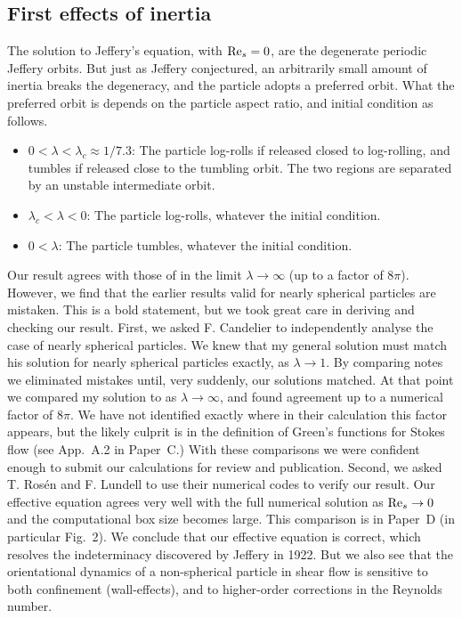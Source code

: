 \documentclass[thesis.tex]{subfiles}
\begin{document}
\subsection*{First effects of inertia}

The solution to Jeffery's equation,  with $\textrm{Re}_s=0$, are the degenerate periodic Jeffery orbits. But just as Jeffery conjectured, an arbitrarily small amount of inertia breaks the degeneracy, and the particle adopts a preferred orbit. What the preferred orbit is depends on the particle aspect ratio, and initial condition as follows.
\begin{itemize}
    \item $0 < \lambda < \lambda_c \approx 1/7.3$: The particle log-rolls if released closed to log-rolling, and tumbles if released close to the tumbling orbit. The two regions are separated by an unstable intermediate orbit.
    \item $\lambda_c < \lambda < 0$: The particle log-rolls, whatever the initial condition.
    \item $0 < \lambda$: The particle tumbles, whatever the initial condition.
\end{itemize}

Our result  agrees with those of \citet{subramanian2005} in the limit $\lambda\to\infty$ (up to a factor of $8\pi$). However, we find that the earlier results valid for nearly spherical particles \cite{saffman1956,subramanian2006} are mistaken. This is a bold statement, but we took great care in deriving and checking our result. First, we asked F. Candelier to independently analyse the case of nearly spherical particles. We knew that my general solution must match his solution for nearly spherical particles exactly, as $\lambda\to1$. By comparing notes we eliminated mistakes until, very suddenly, our solutions matched. At that point we compared my solution to \citet{subramanian2005} as $\lambda\to\infty$, and found agreement up to a numerical factor of $8\pi$. We have not identified exactly where in their calculation this factor appears, but the likely culprit is in the definition of Green's functions for Stokes flow (see App.~A.2 in Paper~C.) With these comparisons we were confident enough to submit our calculations for review and publication. Second, we asked T. Ros\'en and F. Lundell to use their numerical codes to verify our result. Our effective equation  agrees very well with the full numerical solution as $\textrm{Re}_s\to0$ and the computational box size becomes large. This comparison is in Paper~D (in particular Fig.~2). We conclude that our effective equation is correct, which resolves the indeterminacy discovered by Jeffery in 1922. But we also see that the orientational dynamics of a non-spherical particle in shear flow is sensitive to both confinement (wall-effects), and to higher-order corrections in the Reynolds number.
\end{document}
